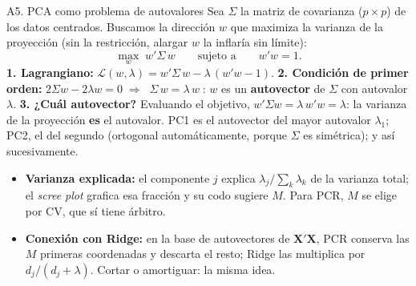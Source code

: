 \documentclass{beamer}
\newcommand{\1}{\mathbb{I}}
\begin{document}
\begin{frame}{A5. PCA como problema de autovalores}
\small
Sea $\Sigma$ la matriz de covarianza ($p \times p$) de los datos centrados. Buscamos la dirección $w$ que maximiza la varianza de la proyección (sin la restricción, alargar $w$ la inflaría sin límite):
\[ \max_{w} \; w'\Sigma\,w \qquad \text{sujeto a} \qquad w'w = 1. \]
\pause
\textbf{1. Lagrangiano:} $\mathcal{L}(w, \lambda) = w'\Sigma\,w - \lambda\,(w'w - 1)$.
\pause
\textbf{2. Condición de primer orden:} $2\Sigma w - 2\lambda w = 0 \;\Longrightarrow\; \boxed{\;\Sigma\,w = \lambda\,w\;}$: $w$ es un \textbf{autovector} de $\Sigma$ con autovalor $\lambda$.
\pause
\textbf{3. ¿Cuál autovector?} Evaluando el objetivo, $w'\Sigma w = \lambda\,w'w = \lambda$: la varianza de la proyección \textbf{es} el autovalor. PC1 es el autovector del mayor autovalor $\lambda_1$; PC2, el del segundo (ortogonal automáticamente, porque $\Sigma$ es simétrica); y así sucesivamente.
\pause
\vspace{0.05cm}
\begin{itemize}\itemsep3pt
  \item \textbf{Varianza explicada:} el componente $j$ explica $\lambda_j / \sum_k \lambda_k$ de la varianza total; el \emph{scree plot} grafica esa fracción y su codo sugiere $M$. Para PCR, $M$ se elige por CV, que sí tiene árbitro.
  \item \textbf{Conexión con Ridge:} en la base de autovectores de $\mathbf{X}'\mathbf{X}$, PCR conserva las $M$ primeras coordenadas y descarta el resto; Ridge las multiplica por $d_j/(d_j + \lambda)$. Cortar o amortiguar: la misma idea.
\end{itemize}
\end{frame}
\end{document}
